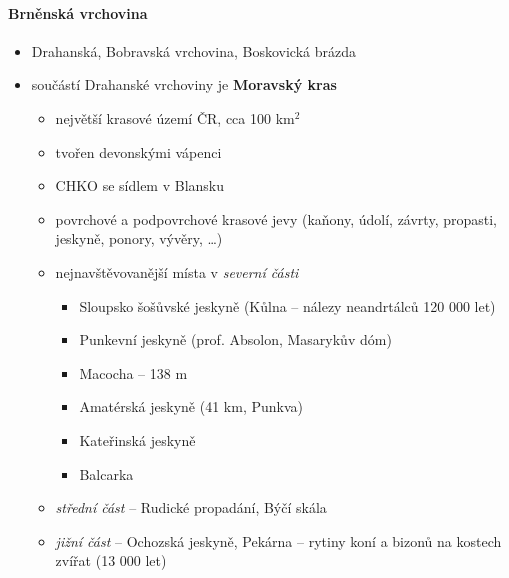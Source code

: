 \paragraph{Brněnská vrchovina}
\begin{itemize}
\item Drahanská, Bobravská vrchovina, Boskovická brázda
\item součástí Drahanské vrchoviny je \textbf{Moravský kras}
	\begin{itemize}
	\item největší krasové území ČR, cca 100 km$^2$
	\item tvořen devonskými vápenci
	\item CHKO se sídlem v Blansku
	\item povrchové a podpovrchové krasové jevy (kaňony, údolí, závrty, propasti, jeskyně, ponory, 
vývěry, \ldots)
	\item nejnavštěvovanější místa v \textit{severní části}
		\begin{itemize}
		\item Sloupsko šošůvské jeskyně (Kůlna -- nálezy neandrtálců 120 000 let)
		\item Punkevní jeskyně (prof. Absolon, Masarykův dóm)
		\item Macocha -- 138 m
		\item Amatérská jeskyně (41 km, Punkva)
		\item Kateřinská jeskyně
		\item Balcarka
		\end{itemize}
	\item \textit{střední část} -- Rudické propadání, Býčí skála
	\item \textit{jižní část} -- Ochozská jeskyně, Pekárna -- rytiny koní a bizonů na kostech zvířat (13 000 let)
	\end{itemize}
\end{itemize}

